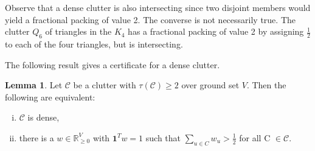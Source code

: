 \documentclass[a4paper, 12pt]{scrbook}
\theoremstyle{definition}
\newtheorem{lemma}[theorem]{Lemma}
\newcommand*{\IR}{\ensuremath{\mathbb{R}}}
\begin{document}
Observe that a dense clutter is also intersecting since two disjoint members would yield a fractional packing of value 2.
The converse is not necessarily true.
The clutter $Q_6$ of triangles in the $K_4$ has a fractional packing of value 2 by assigning $\frac 12$ to each of the four triangles, but is intersecting.

The following result gives a certificate for a dense clutter.
\begin{lemma}\label{certificate}
    Let $\mathcal{C}$ be a clutter with $\tau(\mathcal{C})\geq 2$ over ground set $V$.
    Then the following are equivalent:
    \leavevmode
    \begin{enumerate}[(i)]
        \item $\mathcal{C}$ is dense,
        \item there is a $w \in \IR_{\geq 0}^V$ with $\textbf{1}^Tw=1$ such that $\sum_{u \in C} w_u > \frac 12$ for all C $\in \mathcal{C}$.
    \end{enumerate}
\end{lemma}
\end{document}
